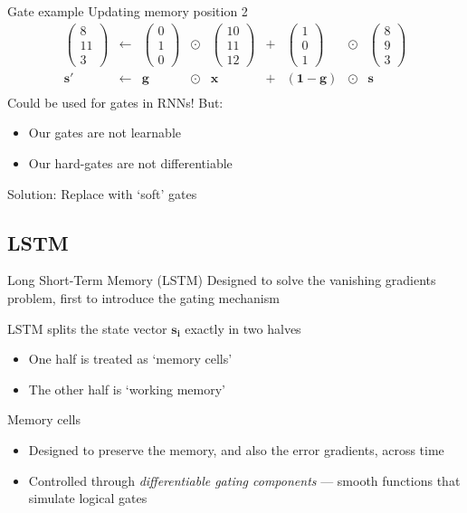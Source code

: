 \documentclass[12pt,aspectratio=169,handout]{beamer}
\begin{document}
\begin{frame}{Gate example}
Updating memory position 2
$$
\begin{aligned}
\begin{pmatrix}
8 \\ 11 \\ 3
\end{pmatrix}
&\gets
&\begin{pmatrix}
0 \\ 1 \\ 0
\end{pmatrix}
&
\odot
&\begin{pmatrix}
10 \\ 11 \\ 12
\end{pmatrix}
&+
&\begin{pmatrix}
1 \\ 0 \\ 1
\end{pmatrix}
&\odot
&\begin{pmatrix}
8 \\ 9 \\ 3
\end{pmatrix}
\\
\bm{s'} &\gets &\bm{g} &\odot &\bm{x} &+ &(\bm{1} - \bm{g}) &\odot &\bm{s} \\
\end{aligned}
$$
\pause
Could be used for gates in RNNs! But:
\begin{itemize}
	\item Our gates are not learnable
	\item Our hard-gates are not differentiable
\end{itemize}
Solution: Replace with `soft' gates
\end{frame}

\subsection{LSTM}

\begin{frame}{Long Short-Term Memory (LSTM)}
Designed to solve the vanishing gradients problem, first to introduce the gating mechanism

\pause
LSTM splits the state vector $\bm{s_i}$ exactly in two halves
\begin{itemize}
	\item One half is treated as `memory cells'
	\item The other half is `working memory'
\end{itemize}

\pause
\begin{block}{Memory cells}
\begin{itemize}
	\item Designed to preserve the memory, and also the error gradients, across time
	\item Controlled through \emph{differentiable gating components} --- smooth functions that simulate logical gates
\end{itemize}
\end{block}


\end{frame}
\end{document}
